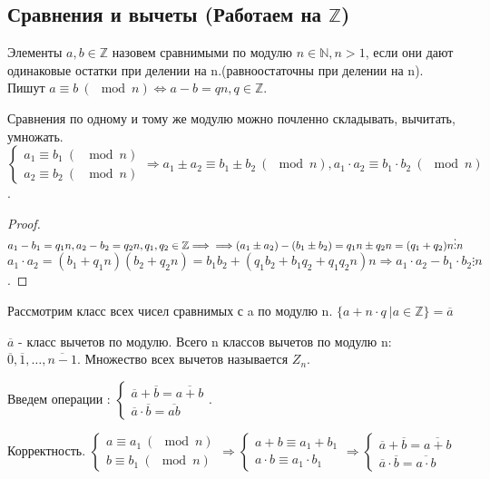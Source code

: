 \subsection{Сравнения и вычеты   (Работаем на \(\mathbb{Z}\))}

\begin{definition}
	Элементы \(a, b\in\mathbb{Z}\) назовем сравнимыми по модулю \(n\in \mathbb{N}, n>1\), если они дают одинаковые остатки при делении на n.(равноостаточны при делении на n). 
	Пишут \(a\equiv b\: (\mod n)\Longleftrightarrow a - b = qn, q\in\mathbb{Z}\).
\end{definition}
\begin{note}
	Сравнения по одному и тому же модулю можно почленно складывать, вычитать, умножать. \(\left\{\begin{gathered}
		a_1 \equiv b_1 \: (~\mod n) \\
		a_2 \equiv b_2 \: (~\mod n)
	\end{gathered}\right.\Longrightarrow a_1\pm a_2 \equiv b_1\pm b_2 \: (\mod n), a_1\cdot a_2 \equiv b_1 \cdot b_2\: (\mod n)\).
\end{note}
\begin{proof}
	\(a_1 - b_1 = q_1n, a_2 - b_2 = q_2n, q_1,q_2\in\mathbb{Z} \Longrightarrow \\ \Longrightarrow (a_1\pm a_2)-(b_1\pm b_2) = q_1n\pm q_2n = (q_1+q_2)n \vdots n\) \newline
	\(a_1\cdot a_2 = (b_1+q_1n)(b_2+q_2n) = b_1b_2 + (q_1b_2+b_1q_2+q_1q_2n)n\Longrightarrow a_1\cdot a_2 - b_1\cdot b_2 \vdots n\).
\end{proof}

Рассмотрим класс всех чисел сравнимых с a по модулю n. \(\{a+n\cdot q\ | a\in\mathbb{Z} \} = \overline a\) 

$\overline a$ - класс вычетов по модулю. Всего n классов вычетов по модулю n: \(\overline 0, \overline 1,\ldots, \overline{n-1}\). Множество всех вычетов называется \(Z_n\).\newline

Введем операции :
\(\left\{\begin{gathered}
	\overline a + \overline b = \overline{a+b} \\
	\overline a\cdot \overline b = \overline{ab}
\end{gathered}\right.\). \newline

Корректность. 
\(\left\{\begin{gathered}
	a\equiv a_1 \: (\mod n) \\
	b\equiv b_1 \: (\mod n)
\end{gathered}\right. \Longrightarrow \left\{\begin{gathered}
	a+b\equiv a_1 + b_1 \\
	a\cdot b\equiv a_1\cdot b_1
\end{gathered}\right.\Longrightarrow \left\{\begin{gathered}
	\overline a + \overline b = \overline{a+b} \\
	\overline a \cdot \overline b = \overline{a\cdot b}
\end{gathered}\right.\)


